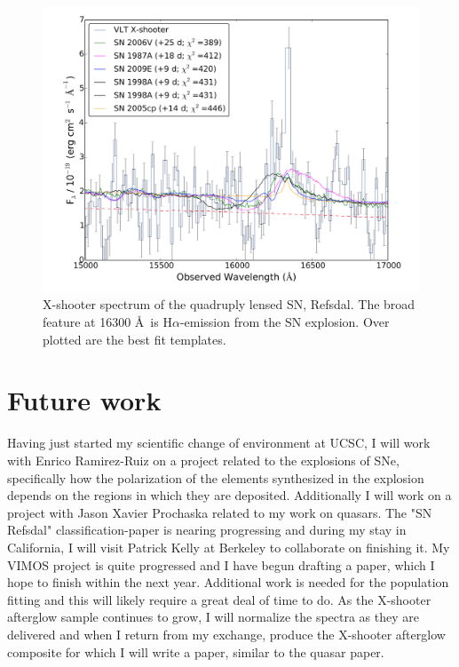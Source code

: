 \begin{figure}[htb]
	
	\includegraphics[width=\textwidth]{gfx/SNref}
	
	\caption{X-shooter spectrum of the quadruply lensed SN, Refsdal. The broad feature at 16300 \AA~is H$\alpha$-emission from the SN explosion. Over plotted are the best fit templates.}
	\label{fig:intro:snref}
\end{figure}

\clearpage

\section{Future work}
\label{sec:intro:fut}

Having just started my scientific change of environment at UCSC, I will work
with Enrico Ramirez-Ruiz on a project related to the explosions of SNe,
specifically how the polarization of the elements synthesized in the explosion
depends on the regions in which they are deposited. Additionally I will work on
a project with Jason Xavier Prochaska related to my work on quasars. 
The "SN
Refsdal" classification-paper is nearing progressing and during my stay
in
California, I will visit Patrick Kelly at Berkeley to collaborate on
finishing
it. My VIMOS project is quite progressed and I have begun drafting a
paper,
which I hope to finish within the next year. Additional work is needed for
the
population fitting and this will likely require a great deal of time to  do.
As
the X-shooter afterglow sample continues to grow, I will normalize the
spectra
as they are delivered and when I return from my exchange, produce the X-shooter
afterglow composite for which I will write a paper, similar to the quasar paper.

